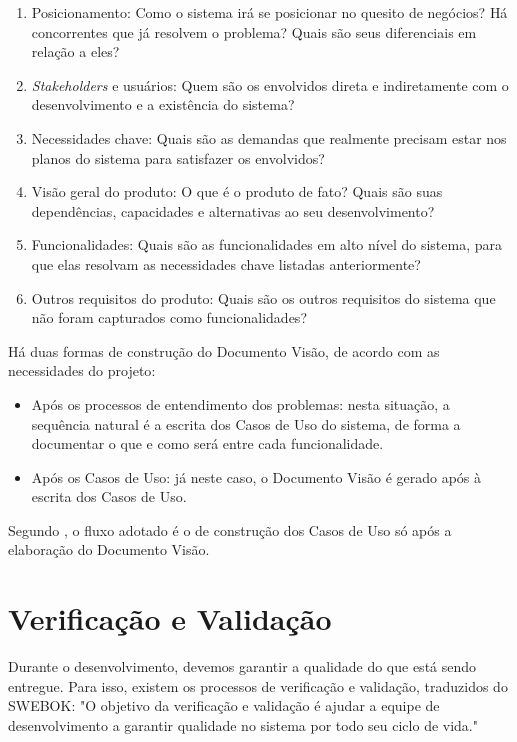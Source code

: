 \begin{enumerate}
    \item Posicionamento: Como o sistema irá se posicionar no quesito de negócios? Há concorrentes que já resolvem o problema? Quais são seus diferenciais em relação a eles?
    \item \textit{Stakeholders} e usuários: Quem são os envolvidos direta e indiretamente com o desenvolvimento e a existência do sistema?
    \item Necessidades chave: Quais são as demandas que realmente precisam estar nos planos do sistema para satisfazer os envolvidos?
    \item Visão geral do produto: O que é o produto de fato? Quais são suas dependências, capacidades e alternativas ao seu desenvolvimento?
    \item Funcionalidades: Quais são as funcionalidades em alto nível do sistema, para que elas resolvam as necessidades chave listadas anteriormente?
    \item Outros requisitos do produto: Quais são os outros requisitos do sistema que não foram capturados como funcionalidades?
\end{enumerate}

Há duas formas de construção do Documento Visão, de acordo com as necessidades do projeto\cite{elisayuminakagawa2013}:
\begin{itemize}
    \item Após os processos de entendimento dos problemas: nesta situação, a sequência natural é a escrita dos Casos de Uso do sistema, de forma a documentar o que e como será entre cada funcionalidade.
    \item Após os Casos de Uso: já neste caso, o Documento Visão é gerado após à escrita dos Casos de Uso.
\end{itemize}

Segundo \cite{kurtbittnerianspence2002}, o fluxo adotado é o de construção dos Casos de Uso só após a elaboração do Documento Visão.

\section{Verificação e Validação}
Durante o desenvolvimento, devemos garantir a qualidade do que está sendo entregue. Para isso, existem os processos de verificação e validação, traduzidos do SWEBOK\cite[cap.~10, p.~6]{ieeecomputersociety2014}: "O objetivo da verificação e validação é ajudar a equipe de desenvolvimento a garantir qualidade no sistema por todo seu ciclo de vida."

